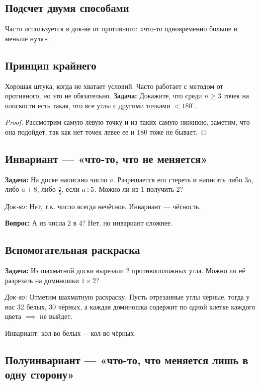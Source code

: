 \documentclass[10pt, a4paper]{article}
\newcommand{\divs}{\mathbin{\vcenter{\baselineskip=2.2pt\lineskiplimit=0pt\hbox{.}\hbox{.}\hbox{.}}}}
\begin{document}
\subsection*{Подсчет двумя способами}
Часто используется в док-ве от противного: «что-то одновременно больше и меньше нуля».

\subsection*{Принцип крайнего}

Хорошая штука, когда не хватает условий. Часто работает с методом от противного, но это не обязательно.
\noindent        
\textbf{Задача:} Докажите, что среди $n\ge 3$ точек на плоскости есть такая, что все углы с другими точками $<180^\circ$. 
\begin{proof}
    Рассмотрим самую левую точку и из таких самую нижнюю, заметим, что она подойдет, так как нет точек левее ее и 180 тоже не бывает. 
\end{proof}

\subsection*{Инвариант --- «что-то, что не меняется»}

\textbf{Задача:} На доске написано число $a$. Разрешается его стереть и написать либо $3a$, либо $a+8$, либо $\frac{a}{5}$, если $a \divs 5$. Можно ли из $1$ получить $2$?

\noindent \textit{Док-во:} Нет, т.к. число всегда нечётное. Инвариант --- чётность.

\noindent \textbf{Вопрос:} А из числа $2$ в $4$? Нет, но инвариант сложнее.

\subsection*{Вспомогательная раскраска}

\textbf{Задача:} Из шахматной доски вырезали 2 противоположных угла. Можно ли её разрезать на доминошки $1 \times 2$?

\noindent \textit{Док-во:} Отметим шахматную раскраску. Пусть отрезанные углы чёрные, тогда у нас 32 белых, 30 чёрных, а каждая доминошка содержит по одной клетке каждого цвета $\implies$ не выйдет.

\noindent Инвариант: кол-во белых $-\,\, \text{кол-во}$ чёрных.

\subsection*{Полуинвариант --- «что-то, что меняется лишь в одну сторону»}
\end{document}
